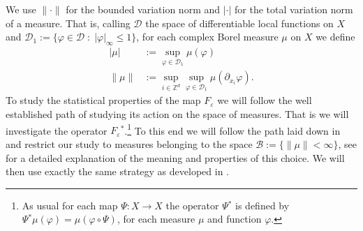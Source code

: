 \documentclass{amsart}
\numberwithin{equation}{section}
\begin{document}
We use $\|\cdot\|$ for the bounded variation norm and $|\cdot|$ for the total
variation norm of a measure. That is, calling ${{\mathcal D}}$ the space of
differentiable local functions on $X$ and
${{\mathcal D}}_1:=\{{\varphi}\in{{\mathcal D}}\;:\;|{\varphi}|_\infty\leq 1\}$, for each complex Borel measure
$\mu$ on $X$ we define
\begin{equation}\label{norms}
  \begin{split}
    |\mu|&:=\sup_{{\varphi}\in{{\mathcal D}}_1}\mu({\varphi})\\
    \|\mu\|&:=\sup_{i\in{{\mathbb Z}}^d}\sup_{{\varphi}\in{{\mathcal D}}_1}\mu(\partial_{x_i}{\varphi}).
  \end{split}
\end{equation}
To study the statistical properties of the map $F_{\varepsilon}$ we will follow the well
established path of studying its action on the space of measures. That is we
will investigate the operator $F_{\varepsilon}{^*}$.\footnote{As usual for each map
  $\Psi:X\to X$ the operator $\Psi{^*}$ is defined by
  $\Psi{^*}\mu({\varphi})=\mu({\varphi}\circ \Psi)$, for each measure $\mu$ and function
  ${\varphi}$.}  To this end we will follow the path laid down in \cite{kl-cmp} and
restrict our study to measures belonging to the space
${{\mathcal B}}:=\{\|\mu\|<\infty\}$, see \cite{kl-lecture} for a detailed explanation of
the meaning and properties of this choice. We will then use exactly the same
strategy as developed in \cite{kl-cmp}.
\end{document}
